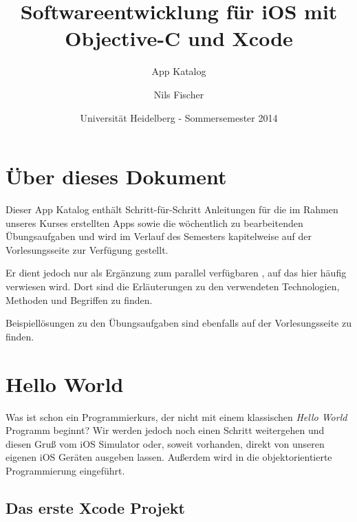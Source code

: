 \documentclass[parskip=half, final]{scrreprt}
\subtitle{App Katalog}
\title{Softwareentwicklung für iOS mit Objective-C und Xcode}
\author{Nils Fischer}
\date{Universität Heidelberg - Sommersemester 2014}
\begin{document}
\maketitle

\tableofcontents


\chapter{Über dieses Dokument}

Dieser App Katalog enthält Schritt-für-Schritt Anleitungen für die im Rahmen unseres Kurses erstellten Apps sowie die wöchentlich zu bearbeitenden Übungsaufgaben und wird im Verlauf des Semesters kapitelweise auf der Vorlesungsseite  zur Verfügung gestellt.

Er dient jedoch nur als Ergänzung zum parallel verfügbaren , auf das hier häufig verwiesen wird. Dort sind die Erläuterungen zu den verwendeten Technologien, Methoden und Begriffen zu finden.

Beispiellösungen zu den Übungsaufgaben sind ebenfalls auf der Vorlesungsseite zu finden.


\chapter{Hello World}

Was ist schon ein Programmierkurs, der nicht mit einem klassischen \emph{Hello World} Programm beginnt? Wir werden jedoch noch einen Schritt weitergehen und diesen Gruß vom iOS Simulator oder, soweit vorhanden, direkt von unseren eigenen iOS Geräten ausgeben lassen. Außerdem wird in die objektorientierte Programmierung eingeführt.


\section{Das erste Xcode Projekt}
\end{document}
